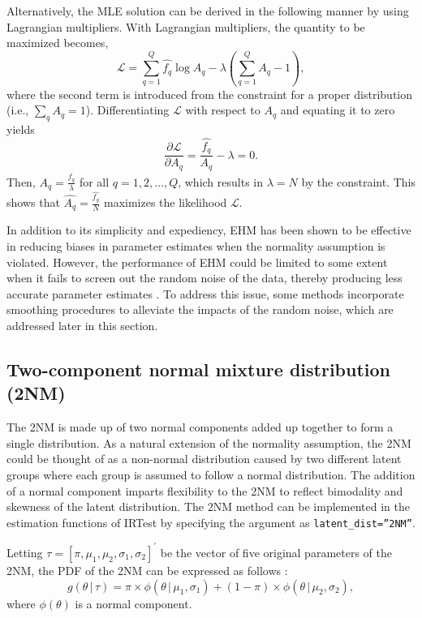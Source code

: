 Alternatively, the MLE solution can be derived in the following manner
by using Lagrangian multipliers. With Lagrangian multipliers, the
quantity to be maximized becomes,
\[\mathcal{L} = \sum_{q = 1}^{Q}{ \hat{f_{q}} \log{A_{q}} } -
\lambda \left( \sum_{q = 1}^{Q}{A_{q}} - 1 \right),
\label{eq:ehmmle}\] where the second term is introduced from the
constraint for a proper distribution (i.e., \(\sum_{q}{A_{q}} = 1\)).
Differentiating \(\mathcal{L}\) with respect to \(A_{q}\) and equating it to
zero yields \[\frac{\partial \mathcal{L}}{\partial A_{q}} =
\frac{\hat{f_{q}}}{A_{q}} - \lambda = 0.
\label{eq:ehmdiffern}\] Then, \(A_{q} = \frac{\hat{f_{q}}}{\lambda}\) for
all \(q = 1, 2, \dots, Q\), which results in \(\lambda = N\) by the
constraint. This shows that \(\hat{ A_{q}} = \frac{\hat{f_{q}}}{N}\)
maximizes the likelihood \(\mathcal{L}\).

In addition to its simplicity and expediency, EHM has been shown to be
effective in reducing biases in parameter estimates when the normality
assumption is violated. However, the performance of EHM could be limited
to some extent when it fails to screen out the random noise of the data,
thereby producing less accurate parameter estimates
\citep{Li:2021, Woods:2015, Woods+Lin:2009}. To address this issue, some
methods incorporate smoothing procedures to alleviate the impacts of the
random noise, which are addressed later in this section.

\hypertarget{two-component-normal-mixture-distribution-2nm}{%
\subsection{Two-component normal mixture distribution (2NM)}\label{two-component-normal-mixture-distribution-2nm}}

The 2NM is made up of two normal components added up together to form a
single distribution. As a natural extension of the normality assumption,
the 2NM could be thought of as a non-normal distribution caused by two
different latent groups where each group is assumed to follow a normal
distribution. The addition of a normal component imparts flexibility to
the 2NM to reflect bimodality and skewness of the latent distribution.
The 2NM method can be implemented in the estimation functions of IRTest
by specifying the argument as \texttt{latent\_dist=”2NM”}.

Letting \(\tau = [\pi, \mu_1, \mu_2, \sigma_1, \sigma_2]^{'}\) be the
vector of five original parameters of the 2NM, the PDF of the 2NM can be
expressed as follows \citep{Li:2021}:
\[g{(\theta \, | \, \tau)} = \pi \times \phi{(\theta \, | \, \mu_1, \sigma_1)} +
(1 - \pi) \times \phi{(\theta \, | \, \mu_2, \sigma_2)},
\label{eq:2nm}\] where \(\phi{(\theta)}\) is a normal component.

